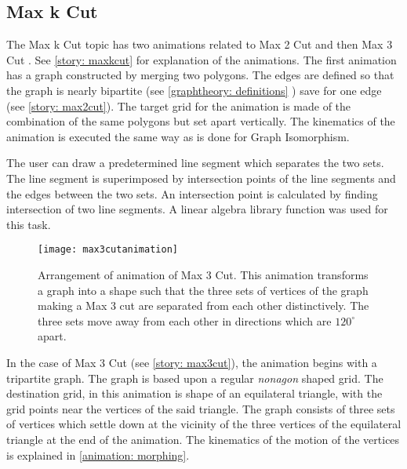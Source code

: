 \subsection{Max k Cut}
\label{impl: maxkcut}
The Max k Cut topic has two animations related to Max
2 Cut and then Max 3 Cut . See \autoref{story: maxkcut} for explanation of the
animations. The first animation has a graph constructed by merging two polygons.
The edges are defined so that the graph is nearly bipartite (see
\autoref{graphtheory: definitions} ) save for one edge (see \autoref{story:
max2cut}). The target grid for the animation is made of the combination of the
same polygons but set apart vertically. The kinematics of the animation is
executed the same way as is done for Graph Isomorphism.

The user can draw a predetermined line segment which separates the two
sets. The line segment is superimposed by intersection points of the
line segments and the edges between the two sets. An intersection point
is calculated by finding intersection of two line segments. A linear algebra
library function was used for this task.


\begin{figure}[h]
\centering
\texttt{[image: max3cutanimation]}
\caption{
        Arrangement of animation of Max 3 Cut. This animation transforms a graph
        into a shape such that the three sets of vertices of the graph making a Max 3 cut
        are separated from each other distinctively. The three sets move away from each
        other in directions which are $120^{\circ}$ apart.
        }
\label{animationfigure: max3cut}
\end{figure}
In the case of Max 3 Cut (see \autoref{story: max3cut}), the animation begins
with a tripartite graph. The graph is based upon a regular \emph{nonagon}
shaped grid. The destination grid, in this animation is shape of an equilateral
triangle, with the grid points near the vertices of the said triangle. The
graph consists of three sets of vertices which settle down at the vicinity of
the three vertices of the equilateral triangle at the end of the animation. The
kinematics of the motion of the vertices is explained in \autoref{animation:
morphing}.


